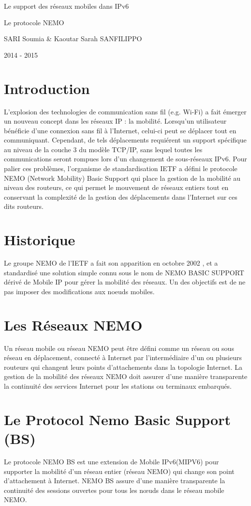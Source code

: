\documentclass[12pt,a4paper]{report}
\newcommand{\myTitle}{
\begingroup 
\centering 


\vspace{\stretch{1}}
{\LARGE Le support des r\'{e}seaux mobiles dans IPv6}%

\vspace*{1\baselineskip}

\LARGE %
Le protocole NEMO
\vspace{\stretch{2}}

\vspace{\stretch{1}}
{\Large SARI Soumia \& Kaoutar Sarah SANFILIPPO\par} 
\vspace{\stretch{2}}

\vspace{\stretch{1}}
{\large 2014 - 2015}
\vspace{\stretch{2}}%
\setcounter{page}{0}

\endgroup}
\begin{document}
\thispagestyle{empty}
\myTitle

\renewcommand{\contentsname}{Sommaire}
\tableofcontents

\newpage
\section{Introduction}

L'explosion des technologies de communication sans fil (e.g. Wi-Fi) a fait \'{e}merger un nouveau
concept dans les r\'{e}seaux IP : la mobilit\'{e}. Lorsqu'un utilisateur b\'{e}n\'{e}ficie d'une connexion sans fil \`a
l'Internet, celui-ci peut se d\'{e}placer tout en communiquant. Cependant, de tels d\'{e}placements
requi\'{e}rent un support sp\'{e}cifique au niveau de la couche 3 du mod\`{e}le TCP/IP, sans lequel toutes les
communications seront rompues lors d'un changement de sous-r\'{e}seaux IPv6. Pour palier ces
probl\`{e}mes, l'organisme de standardisation IETF a d\'{e}fini le protocole NEMO (Network Mobility) Basic
Support qui place la gestion de la mobilit\'{e} au niveau des routeurs, ce qui permet le mouvement de
r\'{e}seaux entiers tout en conservant la complexit\'{e} de la gestion des d\'{e}placements dans l'Internet sur
ces dits routeurs.\cite{ref}

\section{Historique}

Le groupe NEMO de l'IETF a fait son apparition en octobre 2002 , et a standardis\'e une solution simple connu sous
le nom de NEMO BASIC SUPPORT d\'eriv\'e de Mobile IP pour g\'erer la mobilit\'e des r\'eseaux.
Un des objectifs est de ne pas imposer des modifications aux noeuds mobiles.
 
\section{Les R\'eseaux NEMO}
Un r\'eseau mobile ou r\'eseau NEMO peut \^etre d\'efini comme un r\'eseau ou sous r\'eseau en d\'eplacement, connect\'e \`a Internet par l'interm\'ediaire d'un ou plusieurs routeurs qui changent leurs points d'attachements dans la topologie Internet. La gestion de la mobilit\'e des r\'eseaux NEMO doit assurer d'une mani\`ere transparente la continuit\'e des services Internet  pour les stations ou terminaux embarqu\'es.

\section{Le Protocol Nemo  Basic Support (BS)}
Le protocole NEMO BS est une extension de Mobile IPv6(MIPV6) pour supporter la mobilit\'{e} d'un r\'{e}seau entier (r\'{e}seau NEMO) qui change son point d'attachement \`{a} Internet. NEMO BS  assure d'une mani\`ere transparente la continuit\'e des sessions ouvertes pour tous les nœuds dans le r\'eseau mobile NEMO.
\end{document}
